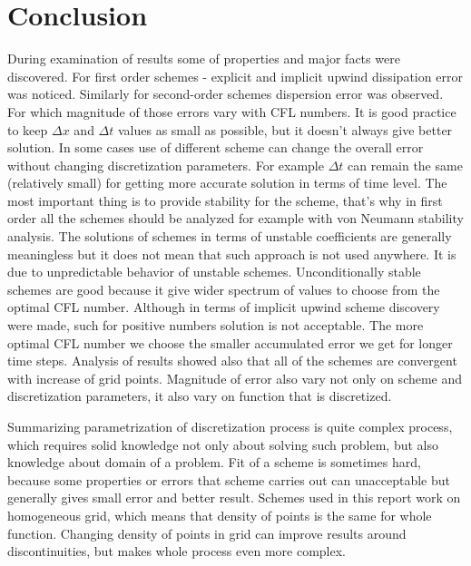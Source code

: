 
\chapter{Conclusion}
	During examination of results some of properties and major facts were discovered. For first order schemes - explicit and implicit upwind dissipation error was noticed. Similarly for second-order schemes dispersion error was observed. For which magnitude of those errors vary with CFL numbers. It is good practice to keep $\Delta x$ and $\Delta t$ values as small as possible, but it doesn't always give better solution. In some cases use of different scheme can change the overall error without changing discretization parameters. For example $\Delta t$ can remain the same (relatively small) for getting more accurate solution in terms of time level. The most important thing is to provide stability for the scheme, that's why in first order all the schemes should be analyzed for example with von Neumann stability analysis. The solutions of schemes in terms of unstable coefficients are generally meaningless but it does not mean that such approach is not used anywhere. It is due to unpredictable behavior of unstable schemes. Unconditionally stable schemes are good because it give wider spectrum of values to choose from the optimal CFL number. Although in terms of implicit upwind scheme discovery were made, such for positive numbers solution is not acceptable. The more optimal CFL number we choose the smaller accumulated error we get for longer time steps. Analysis of results showed also that all of the schemes are convergent with increase of grid points. Magnitude of error also vary not only on scheme and discretization parameters, it also vary on function that is discretized.
	
	Summarizing parametrization of discretization process is quite complex process, which requires solid knowledge not only about solving such problem, but also knowledge about domain of a problem. Fit of a scheme is sometimes hard, because some properties or errors that scheme carries out can unacceptable but generally gives small error and better result. Schemes used in this report work on homogeneous grid, which means that density of points is the same for whole function. Changing density of points in grid can improve results around discontinuities, but makes whole process even more complex. 